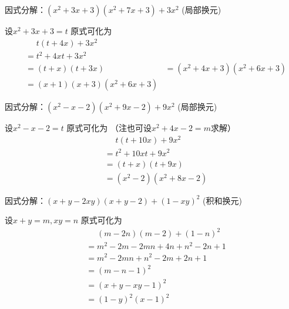 \documentclass[windows,csize4,answers]{BHCexam}
\begin{document}
\begin{groups}
\begin{questions}[]
        \question[5] 因式分解：$(x^2+3x+3)(x^2+7x+3)+3x^2$ (局部换元)
        \begin{solution}{0.5cm}
            \methodonly 设$x^2+3x+3=t$ 原式可化为
            \[
                \begin{aligned}
                     & \phantom{=}t(t+4x)+3x^2 \\
                     & = t^2+4xt+3x^2          \\
                     & = (t+x)(t+3x)
                     & = (x^2+4x+3)(x^2+6x+3)  \\
                     & = (x+1)(x+3)(x^2+6x+3)
                \end{aligned}
            \]
        \end{solution}
        \vspace{3.5cm}

        \question[5] 因式分解：$(x^2-x-2)(x^2+9x-2)+9x^2$ (局部换元)
        \begin{solution}{0.5cm}
            \methodonly 设$x^2-x-2=t$ 原式可化为 （注也可设$x^2+4x-2=m$求解）
            \[
                \begin{aligned}
                     & \phantom{=}t(t+10x)+9x^2 \\
                     & = t^2+10xt+9x^2          \\
                     & = (t+x)(t+9x)            \\
                     & = (x^2-2)(x^2+8x-2)
                \end{aligned}
            \]
        \end{solution}
        \vspace{3.5cm}

        \question[5] 因式分解：$(x+y-2xy)(x+y-2)+(1-xy)^2$ (积和换元)
        \begin{solution}{0.5cm}
            \methodonly 设$x+y=m,xy=n$ 原式可化为
            \[
                \begin{aligned}
                     & \phantom{=}(m-2n)(m-2)+(1-n)^2 \\
                     & = m^2-2m-2mn+4n+n^2-2n+1       \\
                     & = m^2-2mn+n^2-2m+2n+1          \\ %
                     & = (m-n-1)^2                    \\
                     & = (x+y-xy-1)^2                 \\
                     & = (1-y)^2(x-1)^2
                \end{aligned}
            \]
        \end{solution}
        \vspace{3.5cm}


\end{questions}
\end{groups}
\end{document}
